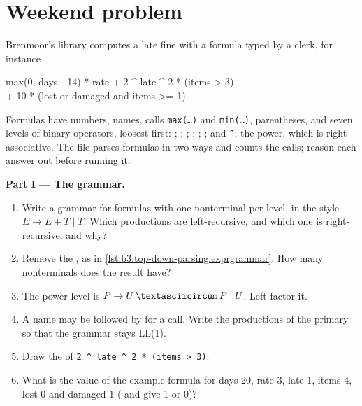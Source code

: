 \section{Weekend problem}\label{sec:b3:top-down-parsing:problem}

\begin{problem}\label{pb:b3:top-down-parsing:1}
Brenmoor's library computes a late fine with a formula typed by a clerk, for instance
\begin{center}\small\ttfamily max(0, days - 14) * rate + 2 \textasciicircum{} late \textasciicircum{} 2 * (items > 3)\\ + 10 * (lost or damaged and items >= 1)\end{center}
Formulas have numbers, names, calls \texttt{max(\dots)} and \texttt{min(\dots)}, parentheses, and seven levels of binary operators, loosest first: ; ; \code{==} \code{!=}; \code{<} \code{<=} \code{>} \code{>=}; \code{+} \code{-}; \code{*} \code{/}; and \texttt{\textasciicircum}, the power, which is right-associative. The file  parses formulas in two ways and counts the calls; reason each answer out before running it.

\medskip\noindent\textbf{Part I --- The grammar.}
\begin{enumerate}
\item Write a grammar for formulas with one nonterminal per level, in the style $E \to E + T \mid T$. Which productions are left-recursive, and which one is right-recursive, and why?
\item Remove the , as in \cref{lst:b3:top-down-parsing:exprgrammar}. How many nonterminals does the result have?
\item The power level is $P \to U\,\textasciicircum\,P \mid U$. Left-factor it.
\item A name may be followed by \code{(} for a call. Write the productions of the primary so that the grammar stays LL(1).
\item Draw the  of \texttt{2 \textasciicircum{} late \textasciicircum{} 2 * (items > 3)}.
\item What is the value of the example formula for days 20, rate 3, late 1, items 4, lost 0 and damaged 1 ( and  give 1 or 0)?
\end{enumerate}


\end{problem}
